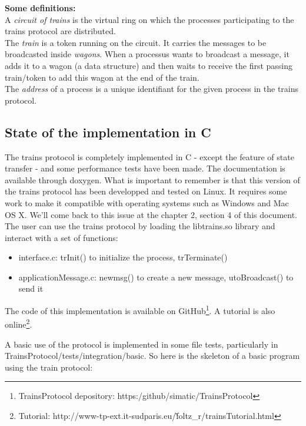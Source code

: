 \documentclass[a4paper,10pt]{report}
\begin{document}
\textbf{Some definitions:}\\ 
A \textit{circuit of trains} is the virtual ring on which the processes participating to the 
trains protocol are distributed.\\
The \textit{train} is a token running on the circuit. It carries the messages to be broadcasted inside \textit{wagons}.
When a processus wants to broadcast a message, it adds it to a wagon (a data structure) and then waits to receive the first passing train/token to add
this wagon at the end of the train.\\
The \textit{address} of a process is a unique identifiant for the given process in the trains protocol.

\subsection{State of the implementation in C}

The trains protocol is completely implemented in C - except the feature of state transfer - and some performance tests have been made.
The documentation is available through doxygen.
What is important to remember is that this version of the trains protocol has been developped and tested on Linux. It requires 
some work to make it compatible with operating systems such as Windows and Mac OS X. We'll come back to this issue at the chapter 2, 
section 4 of this document.\\

The user can use the trains protocol by loading the libtrains.so library and interact with a set of functions:
\begin{itemize}
  \item interface.c: trInit() to initialize the process, trTerminate()
  \item applicationMessage.c: newmsg() to create a new message, utoBroadcast() to send it\\
\end{itemize}


The code of this implementation is available on GitHub\footnote{TrainsProtocol depository: https:/github/simatic/TrainsProtocol}.
A tutorial is also online\footnote{Tutorial: http://www-tp-ext.it-sudparis.eu/\~foltz\_r/trainsTutorial.html}.

A basic use of the protocol is implemented in some file tests, particularly in TrainsProtocol/tests/integration/basic.
So here is the skeleton of a basic program using the train protocol:\\
\end{document}
